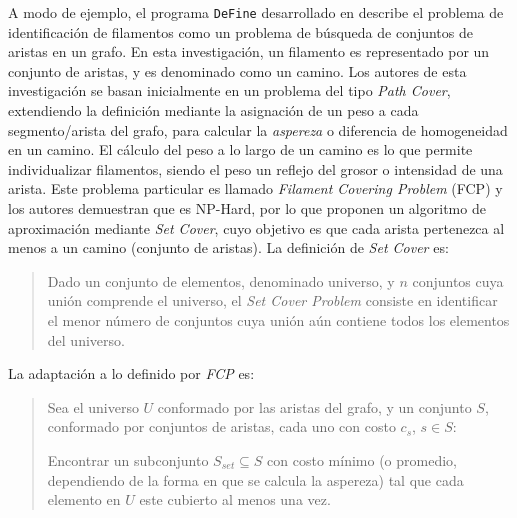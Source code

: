 
\medskip

A modo de ejemplo, el programa \texttt{DeFine} desarrollado en \cite{breuer2015define} describe el problema de identificaci\'on de filamentos como un problema de b\'usqueda de conjuntos de aristas en un grafo. En esta investigaci\'on, un filamento es representado por un conjunto de aristas, y es denominado como un camino. Los autores de esta investigaci\'on se basan inicialmente en un problema del tipo {\it Path Cover}, extendiendo la definici\'on mediante la asignaci\'on de un peso a cada segmento/arista del grafo, para calcular la {\it aspereza} o diferencia de homogeneidad en un camino. El c\'alculo del peso a lo largo de un camino es lo que permite individualizar filamentos, siendo el peso un reflejo del grosor o intensidad de una arista.
Este problema particular es llamado {\it Filament Covering Problem} (FCP) y los autores demuestran que es NP-Hard, por lo que proponen un algoritmo de aproximaci\'on mediante \textit{Set Cover}, cuyo objetivo es que cada arista pertenezca al menos a un camino (conjunto de aristas). La definici\'on de {\it Set Cover} es:

\begin{quote}
Dado un conjunto de elementos, denominado universo, y $n$ conjuntos cuya unión comprende el universo, el {\it Set Cover Problem} consiste en identificar el menor n\'umero de conjuntos cuya unión a\'un contiene todos los elementos del universo.
\end{quote}

La adaptaci\'on a lo definido por {\it FCP} es: 
\begin{quote}
Sea el universo $U$ conformado por las aristas del grafo, y un conjunto $S$, conformado por conjuntos de aristas, cada uno con costo $c_s$, $s \in S$:

Encontrar un subconjunto $S_{set} \subseteq S$ con costo m\'inimo (o promedio, dependiendo de la forma en que se calcula la aspereza) tal que cada elemento en $U$ este cubierto al menos una vez.
\end{quote}

